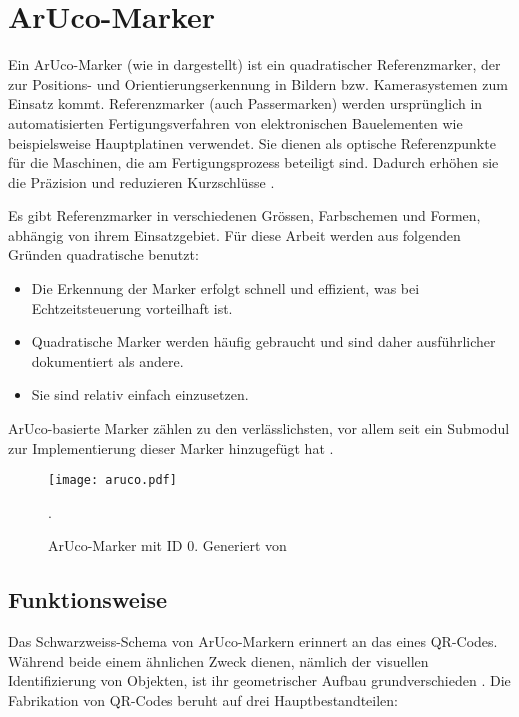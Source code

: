 \section{ArUco-Marker}
\label{sec:aruco}
Ein ArUco-Marker (wie in  dargestellt) ist ein quadratischer Referenzmarker, der zur Positions- und Orientierungserkennung in Bildern bzw. Kamerasystemen zum Einsatz kommt.
Referenzmarker (auch Passermarken) werden ursprünglich in automatisierten Fertigungsverfahren von elektronischen Bauelementen wie beispielsweise Hauptplatinen verwendet.
Sie dienen als optische Referenzpunkte für die Maschinen, die am Fertigungsprozess beteiligt sind.
Dadurch erhöhen sie die Präzision und reduzieren Kurzschlüsse \cite{Wiki:Passermarke}.

Es gibt Referenzmarker in verschiedenen Grössen, Farbschemen und Formen, abhängig von ihrem Einsatzgebiet.
Für diese Arbeit werden aus folgenden Gründen quadratische benutzt:

\begin{itemize}
    \item Die Erkennung der Marker erfolgt schnell und effizient, was bei Echtzeitsteuerung vorteilhaft ist.
    \item Quadratische Marker werden häufig gebraucht und sind daher ausführlicher dokumentiert als andere.
    \item Sie sind relativ einfach einzusetzen.
\end{itemize}

ArUco-basierte Marker zählen zu den verlässlichsten, vor allem seit  ein Submodul zur Implementierung dieser Marker hinzugefügt hat \cite{IJ:fiducial}.

\begin{figure}[H]
    \centering
        \texttt{[image: aruco.pdf]}
    \caption{ArUco-Marker mit ID 0. Generiert von \cite{chev:arucogen}}.
        \label{pic:marker0}
\end{figure}

\subsection{Funktionsweise}
\label{sub:fw}
Das Schwarzweiss-Schema von ArUco-Markern erinnert an das eines QR-Codes.
Während beide einem ähnlichen Zweck dienen, nämlich der visuellen Identifizierung von Objekten, ist ihr geometrischer Aufbau grundverschieden \cite{ten:qrcode}.
Die Fabrikation von QR-Codes beruht auf drei Hauptbestandteilen:

